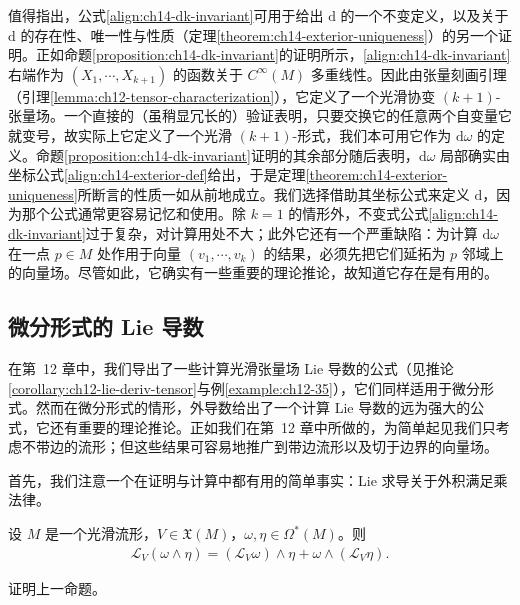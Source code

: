 \documentclass[../../main.tex]{subfiles}
\begin{document}
值得指出，公式\eqref{align:ch14-dk-invariant}可用于给出 $\mathrm{d}$ 的一个不变定义，以及关于 $\mathrm{d}$ 的存在性、唯一性与性质（定理\ref{theorem:ch14-exterior-uniqueness}）的另一个证明。正如命题\ref{proposition:ch14-dk-invariant}的证明所示，\eqref{align:ch14-dk-invariant}右端作为 $(X_1,\cdots ,X_{k+1})$ 的函数关于 $C^\infty(M)$ 多重线性。因此由张量刻画引理（引理\ref{lemma:ch12-tensor-characterization}），它定义了一个光滑协变 $(k+1)$-张量场。一个直接的（虽稍显冗长的）验证表明，只要交换它的任意两个自变量它就变号，故实际上它定义了一个光滑 $(k+1)$-形式，我们本可用它作为 $\mathrm{d}\omega$ 的定义。命题\ref{proposition:ch14-dk-invariant}证明的其余部分随后表明，$\mathrm{d}\omega$ 局部确实由坐标公式\eqref{align:ch14-exterior-def}给出，于是定理\ref{theorem:ch14-exterior-uniqueness}所断言的性质一如从前地成立。我们选择借助其坐标公式来定义 $\mathrm{d}$，因为那个公式通常更容易记忆和使用。除 $k=1$ 的情形外，不变式公式\eqref{align:ch14-dk-invariant}过于复杂，对计算用处不大；此外它还有一个严重缺陷：为计算 $\mathrm{d}\omega$ 在一点 $p\in M$ 处作用于向量 $(v_1,\cdots ,v_k)$ 的结果，必须先把它们延拓为 $p$ 邻域上的向量场。尽管如此，它确实有一些重要的理论推论，故知道它存在是有用的。

\subsection{微分形式的 Lie 导数}

在第~12 章中，我们导出了一些计算光滑张量场 Lie 导数的公式（见推论\ref{corollary:ch12-lie-deriv-tensor}与例\ref{example:ch12-35}），它们同样适用于微分形式。然而在微分形式的情形，外导数给出了一个计算 Lie 导数的远为强大的公式，它还有重要的理论推论。正如我们在第~12 章中所做的，为简单起见我们只考虑不带边的流形；但这些结果可容易地推广到带边流形以及切于边界的向量场。

首先，我们注意一个在证明与计算中都有用的简单事实：Lie 求导关于外积满足乘法律。

\begin{proposition}\label{proposition:ch14-lie-product}
设 $M$ 是一个光滑流形，$V\in\mathfrak X(M)$，$\omega,\eta\in\Omega^*(M)$。则
\begin{align*}
\mathcal L_V(\omega\wedge\eta)=(\mathcal L_V\omega)\wedge\eta+\omega\wedge(\mathcal L_V\eta).
\end{align*}
\end{proposition}

\begin{exercise}\label{exercise:ch14-34}
证明上一命题。
\end{exercise}
\end{document}
